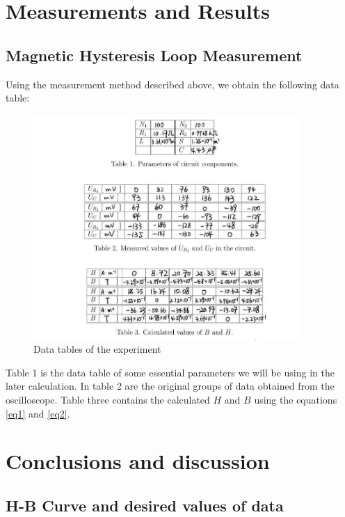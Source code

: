\documentclass[12pt, a4paper, oneside]{article}
\begin{document}
\section{Measurements and Results}
\subsection{Magnetic Hysteresis Loop Measurement}
\indent

Using the measurement method described above, we obtain the following data table: 

\begin{figure}[htbp]
	\centering
	\includegraphics[width=0.9\textwidth]{fig2.png}
	\caption{Data tables of the experiment}
	\label{fig2}
\end{figure}

Table 1 is the data table of some essential parameters we will be using in the later calculation. In table 2 are the original groups of data obtained
from the oscilloscope. Table three contains the calculated $H$ and $B$ using the equations \ref{eq1} and \ref{eq2}. 

\section{Conclusions and discussion}
\indent

\subsection{H-B Curve and desired values of data}
\indent
\end{document}
